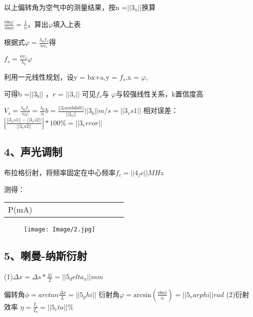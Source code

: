 以上偏转角为空气中的测量结果，按n =$||3_n||$换算


$\frac{\mathrm{sin}\varphi }{\mathrm{sin}\phi }=\frac{1}{n}$，算出$\varphi$填入上表

根据式$\varphi =\frac{{\lambda }_{0}{f}_{s}}{n{v}_{s}}$得

${f}_{s}=\frac{n{v}_{\delta }}{{\lambda }_{0}}\varphi $

利用一元线性规划，设y = bx+a,y = ${f}_{s}$,x = $\varphi $,

可得b =$||3_b||$ ，$r$ = $||3_r||$ 
可见${f}_{s}$与 $\varphi $与较强线性关系，k置信度高

${V}_{s}=\frac{{\lambda }_{0}{f}_{s}}{n\varphi }=\frac{{\lambda }_{0}}{n}b= \frac{{||3_lambda0 ||}}{||3_n||}||3_b||m/s = ||3_vs1||$
相对误差：$\left|\frac{||3_vs1||-||3_vs2||}{||3_vs2||}\right|*100\%=||3_error||$

\subsection*{4、声光调制}
布拉格衍射，将频率固定在中心频率${f}_{c} = ||4_fc||MHz$

测得：\begin{tabular}{|c|c|c|c|c|c|c|c|c|c|c|c|}
	\hline 
	P(mA)&{%
	\hline 
	$I_1/$格&{%
	\hline 
\end{tabular} 

\begin{figure}[H]
	\centering
	\texttt{[image: Image/2.jpg]}
\end{figure}

\subsection*{5、喇曼-纳斯衍射}
(1)$\Delta x=\Delta s*\frac{41}{2} =||5_delta_x||mm$

偏转角$\phi  =arctan\frac{\Delta x}{L} = ||5_phi||$
衍射角$\varphi =\mathrm{arcsin}\left(\frac{\mathrm{sin}\phi }{n}\right) =||5_varphi||rad$
(2)衍射效率
$\eta = \frac{{I}_{1}}{{I}_{0}} = ||5_eta||\%$